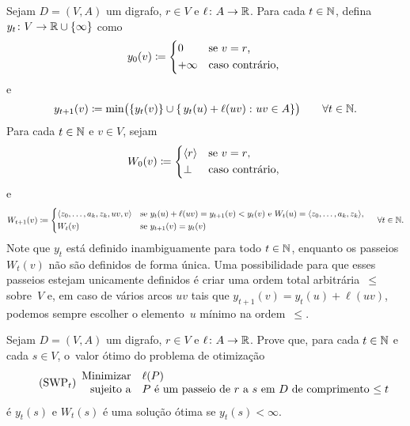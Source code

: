 \documentclass[10pt,reqno]{amsart}
\begin{document}
Sejam \(D = (V,A)\) um digrafo, \(r \in V\) e
\(\ell \colon A \to \mathbb{R}\).  Para cada \(t \in \mathbb{N}\), defina
\(y_t \colon V \to \mathbb{R} \cup \{\infty\}\) como
\begin{equation}
  \label{eq:6}
  y_0(v)
  \coloneqq
  \begin{cases*}
    0       & se \(v = r\),   \\
    +\infty & caso contrário, \\
  \end{cases*}
\end{equation}
e
\begin{equation}
  \label{eq:7}
  y_{t+1}(v)
  \coloneqq
  \min\paren[\big]{
    \set{y_t(v)}
    \cup
    \setst{
      y_t(u) + \ell(uv)
    }{
      uv \in A
    }}
  \qquad
  \forall t \in \Naturals.
\end{equation}
Para cada \(t \in \mathbb{N}\) e \(v \in V\), sejam
\begin{equation}
  \label{eq:8}
  W_0(v)
  \coloneqq
  \begin{cases*}
    \seq{r} & se \(v = r\),   \\
    \bot    & caso contrário, \\
  \end{cases*}
\end{equation}
e
\begin{equation}
  \label{eq:9}
  W_{t+1}(v)
  \coloneqq
  \begin{cases*}
    \seq{z_0,\dotsc,a_k,z_k,uv,v} & se \(y_t(u) + \ell(uv) =
    y_{t+1}(v) < y_t(v)\) e \(W_t(u) = \seq{z_0,\dotsc,a_k,z_k}\), \\
    W_t(v) & se \(y_{t+1}(v) = y_t(v)\) \\
  \end{cases*}
  \quad
  \forall t \in \Naturals.
\end{equation}
Note que \(y_t\) está definido inambiguamente para todo
\(t \in \mathbb{N}\), enquanto os passeios \(W_t(v)\) não são definidos
de forma única.  Uma possibilidade para que esses passeios estejam
unicamente definidos é criar uma ordem total arbitrária~\(\leq\)
sobre~\(V\) e, em caso de vários arcos \(uv\) tais que
\(y_{t+1}(v) = y_t(u) + \ell(uv)\), podemos sempre escolher o
elemento~\(u\) mínimo na ordem~\(\leq\).

\begin{exercise}
  \label{ex:5}
  Sejam \(D = (V,A)\) um digrafo, \(r \in V\) e
  \(\ell \colon A \to \mathbb{R}\).  Prove que, para cada
  \(t \in \mathbb{N}\) e cada \(s \in V\), o~valor ótimo do problema de
  otimização
  \begin{equation}
    \tag{SWP\({}_t\)}
    \begin{array}{{rl}}
      \text{Minimizar}   & \ell(P) \\
      \text{sujeito a} & \text{\(P\) é um passeio de \(r\) a \(s\) em~\(D\) de comprimento \(\leq t\)} \\
    \end{array}
  \end{equation}
  é \(y_t(s)\) e \(W_t(s)\) é uma solução ótima se
  \(y_t(s) < \infty\).
\end{exercise}
\end{document}
